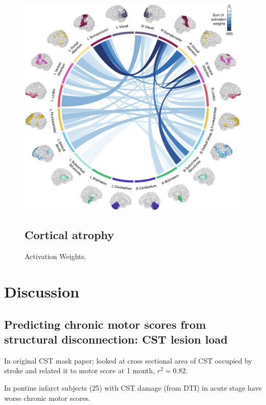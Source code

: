 \documentclass[10pt]{article}
\begin{document}
\begin{figure}[htp]
\centering
\includegraphics[width=1.0\linewidth]{figures/chorddiagram_stdCV_LRsplit_onebrain.png}
\caption{Activation Weights.}

\label{}

\subsection{Cortical atrophy}

\end{figure}

\section{Discussion}

\subsection*{Predicting chronic motor scores from structural disconnection: CST lesion load}
In \cite{Pineiro2000-dv} original CST mask paper; looked at cross sectional area of CST occupied by stroke and related it to motor score at 1 month, $r^2 = 0.82$.

In \cite{Jang2008-ns} pontine infarct subjects (25) with CST damage (from DTI) in acute stage have worse chronic motor scores. 
\end{document}
